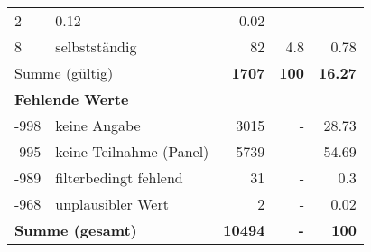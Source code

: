 \begin{longtable}{lXrrr}
       \num{2} &
       \num[round-mode=places,round-precision=2]{0,12} &
         \num[round-mode=places,round-precision=2]{0,02} \\

     8 &
     \multicolumn{1}{X}{ selbstständig   } &


       \num{82} &
       \num[round-mode=places,round-precision=2]{4,8} &
         \num[round-mode=places,round-precision=2]{0,78} \\
     \midrule
     \multicolumn{2}{l}{Summe (gültig)} &
       \textbf{\num{1707}} &
     \textbf{100} &
       \textbf{\num[round-mode=places,round-precision=2]{16,27}} \\
     \multicolumn{5}{l}{\textbf{Fehlende Werte}}\\
       -998 &
       keine Angabe &
         \num{3015} &
        - &
         \num[round-mode=places,round-precision=2]{28,73} \\
       -995 &
       keine Teilnahme (Panel) &
         \num{5739} &
        - &
         \num[round-mode=places,round-precision=2]{54,69} \\
       -989 &
       filterbedingt fehlend &
         \num{31} &
        - &
         \num[round-mode=places,round-precision=2]{0,3} \\
       -968 &
       unplausibler Wert &
         \num{2} &
        - &
         \num[round-mode=places,round-precision=2]{0,02} \\
     \midrule
     \multicolumn{2}{l}{\textbf{Summe (gesamt)}} &
          \textbf{\num{10494}} &
        \textbf{-} &
        \textbf{100} \\
     \bottomrule
     \end{longtable}
     
